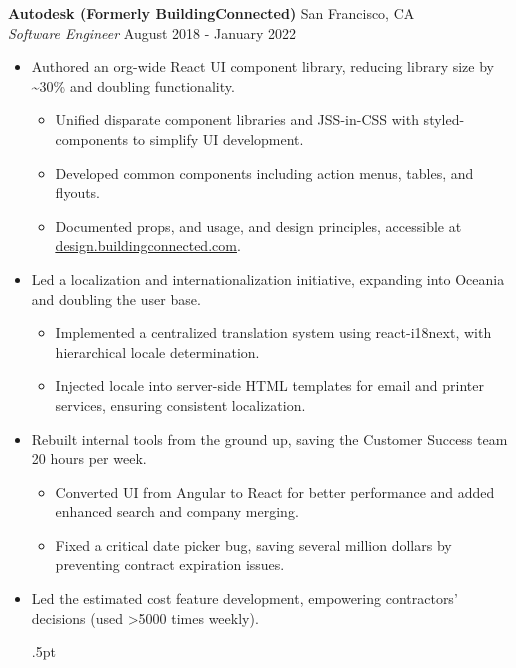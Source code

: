 \documentclass[a4paper]{article}
\begin{document}
\textbf{Autodesk (Formerly BuildingConnected)} \hfill San Francisco, CA\\
\textit{Software Engineer} \hfill August 2018 - January 2022\\
\vspace{-1mm}
\begin{itemize} \itemsep .5pt
    \item Authored an org-wide React UI component library, reducing library size by \textasciitilde{}30\% and doubling functionality.
    \begin{itemize} \itemsep .5pt
        \item Unified disparate component libraries and JSS-in-CSS with styled-components to simplify UI development.
        \item Developed common components including action menus, tables, and flyouts.
        \item Documented props, and usage, and design principles, accessible at \href{https://design.buildingconnected.com/}{\underline{design.buildingconnected.com}}.
        \end{itemize}
    \item Led a localization and internationalization initiative, expanding into Oceania and doubling the user base.
    \begin{itemize} \itemsep .5pt
            \item Implemented a centralized translation system using react-i18next, with hierarchical locale determination.
            \item Injected locale into server-side HTML templates for email and printer services, ensuring consistent localization.  
        \end{itemize}
    \item Rebuilt internal tools from the ground up, saving the Customer Success team 20 hours per week.
    \begin{itemize} \itemsep .5pt
            \item Converted UI from Angular to React for better performance and added enhanced search and company merging.
            \item Fixed a critical date picker bug, saving several million dollars by preventing contract expiration issues.
        \end{itemize}
    \item Led the estimated cost feature development, empowering contractors' decisions (used >5000 times weekly).
    \begin{itemize} \itemsep .5pt

\end{itemize}
\end{itemize}
\end{document}
